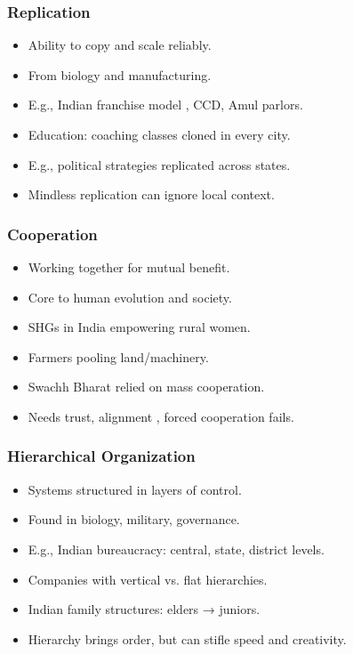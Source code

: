 \begin{frame}[fragile]\frametitle{Replication}
  \begin{itemize}
    \item Ability to copy and scale reliably.
    \item From biology and manufacturing.
    \item E.g., Indian franchise model , CCD, Amul parlors.
    \item Education: coaching classes cloned in every city.
    \item E.g., political strategies replicated across states.
    \item Mindless replication can ignore local context.
  \end{itemize}
\end{frame}

\begin{frame}[fragile]\frametitle{Cooperation}
  \begin{itemize}
    \item Working together for mutual benefit.
    \item Core to human evolution and society.
    \item SHGs in India empowering rural women.
    \item Farmers pooling land/machinery.
    \item Swachh Bharat relied on mass cooperation.
    \item Needs trust, alignment , forced cooperation fails.
  \end{itemize}
\end{frame}

\begin{frame}[fragile]\frametitle{Hierarchical Organization}
  \begin{itemize}
    \item Systems structured in layers of control.
    \item Found in biology, military, governance.
    \item E.g., Indian bureaucracy: central, state, district levels.
    \item Companies with vertical vs. flat hierarchies.
    \item Indian family structures: elders → juniors.
    \item Hierarchy brings order, but can stifle speed and creativity.
  \end{itemize}
\end{frame}

